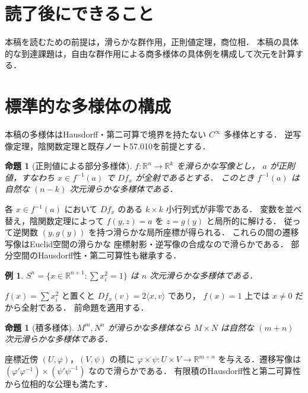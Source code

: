 \documentclass[a5paper,10pt,onecolumn]{jsarticle}
\makeatletter
\theoremstyle{mathnotetheorem}
\newtheorem{proposition}[theorem]{命題}
\newtheorem{example}[theorem]{例}
\renewcommand{\proofname}{証明}
\renewenvironment{proof}[1][\proofname]{%
  \par\pushQED{\qed}\normalfont\topsep4\p@\@plus2\p@\relax
  \trivlist\item[\hskip\labelsep\bfseries #1]\ignorespaces
}{\popQED\endtrivlist\@endpefalse}
\makeatother
\begin{document}
\section*{読了後にできること}
本稿を読むための前提は，滑らかな群作用，正則値定理，商位相．
本稿の具体的な到達課題は，自由な群作用による商多様体の具体例を構成して次元を計算する．


\section{標準的な多様体の構成}
本稿の多様体はHausdorff・第二可算で境界を持たない
$C^\infty$ 多様体とする．
逆写像定理，陰関数定理と既存ノート57.010を前提とする．
\begin{proposition}[正則値による部分多様体]
$f:\mathbb R^n\to\mathbb R^k$ を滑らかな写像とし，
$a$ が正則値，すなわち $x\in f^{-1}(a)$ で
$Df_x$ が全射であるとする．
このとき $f^{-1}(a)$ は自然な $(n-k)$ 次元滑らかな多様体である．
\end{proposition}
\begin{proof}
各 $x\in f^{-1}(a)$ において
$Df_x$ のある $k\times k$ 小行列式が非零である．
変数を並べ替え，陰関数定理によって
$f(y,z)=a$ を $z=g(y)$ と局所的に解ける．
従って逆関数 $(y,g(y))$ を持つ滑らかな局所座標が得られる．
これらの間の遷移写像はEuclid空間の滑らかな
座標射影・逆写像の合成なので滑らかである．
部分空間のHausdorff性・第二可算性も継承する．
\end{proof}
\begin{example}
$S^n=\{x\in\mathbb R^{n+1}:\sum x_i^2=1\}$ は
$n$ 次元滑らかな多様体である．
\end{example}
\begin{proof}
$f(x)=\sum x_i^2$ と置くと
$Df_x(v)=2\langle x,v\rangle$ であり，
$f(x)=1$ 上では $x\ne0$ だから全射である．
前命題を適用する．
\end{proof}
\begin{proposition}[積多様体]
$M^m,N^n$ が滑らかな多様体なら
$M\times N$ は自然な $(m+n)$ 次元滑らかな多様体である．
\end{proposition}
\begin{proof}
座標近傍 $(U,\varphi)$，$(V,\psi)$ の積に
$\varphi\times\psi:U\times V\to\mathbb R^{m+n}$
を与える．遷移写像は
$(\varphi'\varphi^{-1})\times(\psi'\psi^{-1})$
なので滑らかである．
有限積のHausdorff性と第二可算性から位相的な公理も満たす．
\end{proof}
\end{document}
